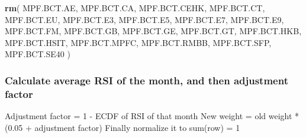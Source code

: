\documentclass[]{article}
\newenvironment{Shaded}{\begin{snugshade}}{\end{snugshade}}
\newcommand{\KeywordTok}[1]{\textcolor[rgb]{0.13,0.29,0.53}{\textbf{#1}}}
\newcommand{\NormalTok}[1]{#1}
\begin{document}
\begin{Shaded}
\begin{Highlighting}[]
\KeywordTok{rm}\NormalTok{(}
\NormalTok{  MPF.BCT.AE,}
\NormalTok{  MPF.BCT.CA,}
\NormalTok{  MPF.BCT.CEHK,}
\NormalTok{  MPF.BCT.CT,}
\NormalTok{  MPF.BCT.EU,}
\NormalTok{  MPF.BCT.E3,}
\NormalTok{  MPF.BCT.E5,}
\NormalTok{  MPF.BCT.E7,}
\NormalTok{  MPF.BCT.E9,}
\NormalTok{  MPF.BCT.FM,}
\NormalTok{  MPF.BCT.GB,}
\NormalTok{  MPF.BCT.GE,}
\NormalTok{  MPF.BCT.GT,}
\NormalTok{  MPF.BCT.HKB,}
\NormalTok{  MPF.BCT.HSIT,}
\NormalTok{  MPF.BCT.MPFC,}
\NormalTok{  MPF.BCT.RMBB,}
\NormalTok{  MPF.BCT.SFP,}
\NormalTok{  MPF.BCT.SE40}
\NormalTok{)}
\end{Highlighting}
\end{Shaded}

\hypertarget{calculate-average-rsi-of-the-month-and-then-adjustment-factor}{%
\subsubsection{Calculate average RSI of the month, and then adjustment
factor}\label{calculate-average-rsi-of-the-month-and-then-adjustment-factor}}

Adjustment factor = 1 - ECDF of RSI of that month New weight = old
weight * (0.05 + adjustment factor) Finally normalize it to sum(row) = 1
\end{document}
